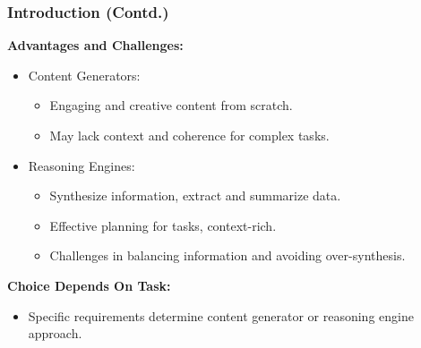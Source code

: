 \begin{frame}[fragile]
\frametitle{Introduction (Contd.)}

\textbf{Advantages and Challenges:}
\begin{itemize}
    \item Content Generators:
        \begin{itemize}
            \item Engaging and creative content from scratch.
            \item May lack context and coherence for complex tasks.
        \end{itemize}
    \item Reasoning Engines:
        \begin{itemize}
            \item Synthesize information, extract and summarize data.
            \item Effective planning for tasks, context-rich.
            \item Challenges in balancing information and avoiding over-synthesis.
        \end{itemize}
\end{itemize}

\textbf{Choice Depends On Task:}
\begin{itemize}
    \item Specific requirements determine content generator or reasoning engine approach.
\end{itemize}

\end{frame}



